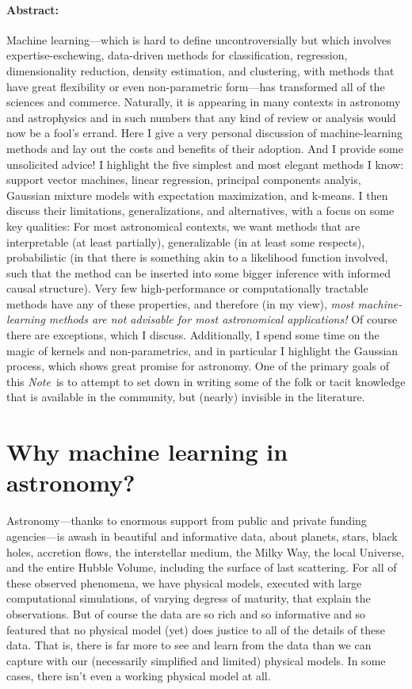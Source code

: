\documentclass[12pt, twoside, letterpaper]{article}
\newcommand{\documentname}{\textsl{Note}}
\begin{document}
\paragraph{Abstract:}
Machine learning---which is hard to define uncontroversially
but which involves expertise-eschewing, data-driven methods for classification,
regression, dimensionality reduction, density estimation, and clustering,
with methods that have great flexibility or even non-parametric form---has transformed all
of the sciences and commerce.
Naturally, it is appearing in many contexts in astronomy and astrophysics and
in such numbers that any kind of review or analysis would now be a fool's errand.
Here I give a very personal discussion of machine-learning methods and lay out the costs and
benefits of their adoption.
And I provide some unsolicited advice!
I highlight the five simplest and most elegant methods I know: support vector
machines, linear regression, principal components analyis, Gaussian mixture models
with expectation maximization, and k-means.
I then discuss their limitations, generalizations, and alternatives, with a focus
on some key qualities:
For most astronomical contexts, we want methods that are interpretable (at least
partially), generalizable (in at least some respects), probabilistic (in that
there is something akin to a likelihood function involved, such that the method can
be inserted into some bigger inference with informed causal structure).
Very few high-performance or computationally tractable methods have any of these
properties, and therefore (in my view),
\emph{most machine-learning methods are not advisable for most astronomical
applications!}
Of course there are exceptions, which I discuss.
Additionally, I spend some time on the magic of kernels and non-parametrics, and in particular
I highlight the Gaussian process, which shows great promise for astronomy.
One of the primary goals of this \documentname\ is to attempt to set down in writing
some of the folk or tacit knowledge that is available in the community, but
(nearly) invisible in the literature.

\clearpage\section{Why machine learning in astronomy?}

Astronomy---thanks to enormous support from public and private funding
agencies---is awash in beautiful and informative data, about planets, stars,
black holes, accretion flows,
the interstellar medium, the Milky Way, the local Universe, and the entire
Hubble Volume, including the surface of last scattering.
For all of these observed phenomena, we have physical models, executed
with large computational simulations, of varying degress of maturity,
that explain the observations.
But of course the data are so rich and so informative and so featured
that no physical model (yet) does justice to all of the details of these
data.
That is, there is far more to see and learn from the data than we can
capture with our (necessarily simplified and limited) physical models.
In some cases, there isn't even a working physical model at all.
\end{document}
